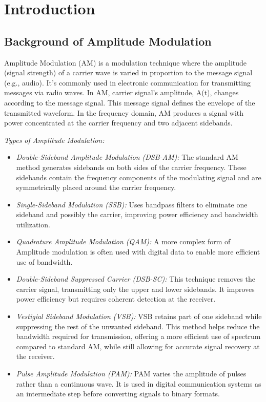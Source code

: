 \documentclass[conference]{IEEEtran}
\begin{document}
\section{Introduction}

\subsection{Background of Amplitude Modulation}
Amplitude Modulation (AM) is a modulation technique where the amplitude (signal strength) of a carrier wave is varied in proportion to the message signal (e.g., audio). It's commonly used in electronic communication for transmitting messages via radio waves.
In AM,  carrier signal's amplitude, A(t), changes according to the message signal.  This message signal defines the envelope of the transmitted waveform. In the frequency domain, AM produces a signal with power concentrated at the carrier frequency and two adjacent sidebands.

\textit{Types of Amplitude Modulation: }
\begin{itemize}
    \item \textit{Double-Sideband Amplitude Modulation (DSB-AM): } The standard AM method generates sidebands on both sides of the carrier frequency. These sidebands contain the frequency components of the modulating signal and are symmetrically placed around the carrier frequency.
    \item \textit{Single-Sideband Modulation (SSB):} Uses bandpass filters to eliminate one sideband and possibly the carrier, improving power efficiency and bandwidth utilization.
    \item \textit{Quadrature Amplitude Modulation (QAM): }A more complex form of Amplitude modulation is often used with digital data to enable more efficient use of bandwidth.
    \item \textit{ Double-Sideband Suppressed Carrier (DSB-SC): } This technique removes the carrier signal, transmitting only the upper and lower sidebands. It improves power efficiency but requires coherent detection at the receiver.
    \item \textit{Vestigial Sideband Modulation (VSB): } VSB retains part of one sideband while suppressing the rest of the unwanted sideband. This method helps reduce the bandwidth required for transmission, offering a more efficient use of spectrum compared to standard AM, while still allowing for accurate signal recovery at the receiver.
    \item \textit{Pulse Amplitude Modulation (PAM): }PAM varies the amplitude of pulses rather than a continuous wave. It is used in digital communication systems as an intermediate step before converting signals to binary formats.
\end{itemize}
\end{document}
